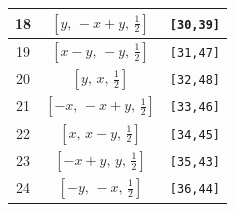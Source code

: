 \documentclass[fleqn,8pt]{jsarticle}
\begin{document}
\begin{longtable}{ccc}
18 & $\left[ y,\, - x + y,\, \frac{1}{2} \right]$ & {\tt [30,39]} \\ \hline
19 & $\left[ x - y,\, - y,\, \frac{1}{2} \right]$ & {\tt [31,47]} \\ \hline
20 & $\left[ y,\, x,\, \frac{1}{2} \right]$ & {\tt [32,48]} \\ \hline
21 & $\left[ - x,\, - x + y,\, \frac{1}{2} \right]$ & {\tt [33,46]} \\ \hline
22 & $\left[ x,\, x - y,\, \frac{1}{2} \right]$ & {\tt [34,45]} \\ \hline
23 & $\left[ - x + y,\, y,\, \frac{1}{2} \right]$ & {\tt [35,43]} \\ \hline
24 & $\left[ - y,\, - x,\, \frac{1}{2} \right]$ & {\tt [36,44]} \\
\end{longtable}
\renewcommand{\arraystretch}{1.2}
\end{document}
